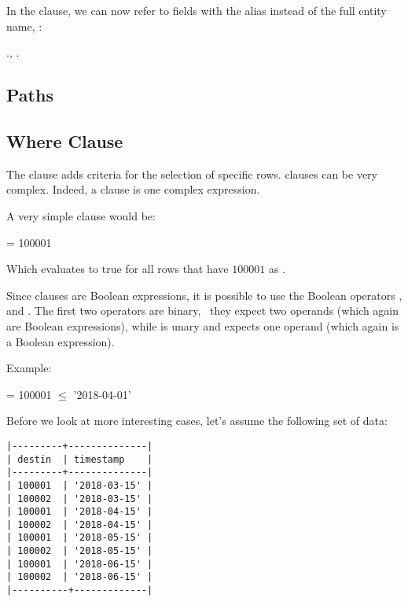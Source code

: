 In the  clause, we can now refer to fields
with the alias instead of the full entity name, \eg:

 .,
                 .



\subsection{Paths}\label{subsec_paths}

\subsection{Where Clause}\label{subsec_where}
The  clause adds criteria for the selection
of specific rows.  clauses can be very complex.
Indeed, a  clause is one complex  expression.

A very simple  clause would be:

  = 100001

Which evaluates to true for all rows that have $100001$
as .

Since  clauses are Boolean expressions,
it is possible to use the Boolean operators
,  and .
The first two operators are binary, \ie\
they expect two operands (which again are
Boolean expressions), while 
is unary and expects one operand (which again
is a Boolean expression).

Example:

  = 100001
  $\le$ '2018-04-01'

Before we look at more interesting cases,
let's assume the following set of data:

\begin{minipage}{\textwidth}
\begin{verbatim}
|---------+--------------|
| destin  | timestamp    |
|---------+--------------|
| 100001  | '2018-03-15' |
| 100002  | '2018-03-15' |
| 100001  | '2018-04-15' |
| 100002  | '2018-04-15' |
| 100001  | '2018-05-15' |
| 100002  | '2018-05-15' |
| 100001  | '2018-06-15' |
| 100002  | '2018-06-15' |
|----------+-------------|
\end{verbatim}
\end{minipage}

